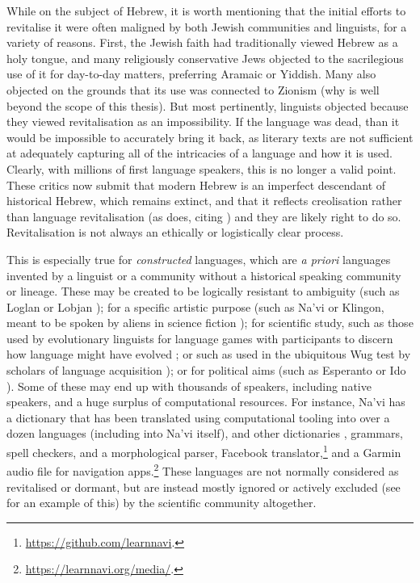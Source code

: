 While on the subject of Hebrew, it is worth mentioning that the initial efforts to revitalise it were often maligned by both Jewish communities and linguists, for a variety of reasons. First, the Jewish faith had traditionally viewed Hebrew as a holy tongue, and many religiously conservative Jews objected to the sacrilegious use of it for day-to-day matters, preferring Aramaic or Yiddish. Many also objected on the grounds that its use was connected to Zionism (why is well beyond the scope of this thesis). But most pertinently, linguists objected because they viewed revitalisation as an impossibility. If the language was dead, than it would be impossible to accurately bring it back, as literary texts are not sufficient at adequately capturing all of the intricacies of a language and how it is used. Clearly, with millions of first language speakers, this is no longer a valid point. These critics now submit that modern Hebrew is an imperfect descendant of historical Hebrew, which remains extinct, and that it reflects creolisation rather than language revitalisation (as \citet{kornai2013digital} does, citing \citet{bickerton2016roots,izreel2003emergence}) and they are likely right to do so. Revitalisation is not always an ethically or logistically clear process.

This is especially true for \textit{constructed} languages, which are \textit{a priori} languages invented by a linguist or a community without a historical speaking community or lineage. These may be created to be logically resistant to ambiguity (such as Loglan or Lobjan \citep{okrent2009land}); for a specific artistic purpose (such as Na'vi or Klingon, meant to be spoken by aliens in science fiction \citep{schreyer2015digital, schreyer2011media}); for scientific study, such as those used by evolutionary linguists for language games with participants to discern how language might have evolved \citep{scott2010language}; or such as used in the ubiquitous Wug test by scholars of language acquisition \citep{ratner2000beginning}); or for political aims (such as Esperanto or Ido \citep{okrent2009land}). Some of these may end up with thousands of speakers, including native speakers, and a huge surplus of computational resources. For instance, Na'vi has a dictionary \citep{navidictionary} that has been translated using computational tooling into over a dozen languages (including into Na'vi itself), and other dictionaries \citep{wmannis}, grammars, spell checkers, and a morphological parser, Facebook translator,\footnote{\href{https://github.com/learnnavi}{https://github.com/learnnavi}. } and a Garmin audio file for navigation apps.\footnote{\href{https://learnnavi.org/media/}{https://learnnavi.org/media/}. } These languages are not normally considered as revitalised or dormant, but are instead mostly ignored or actively excluded (see \citet{gibson2016assessing} for an example of this) by the scientific community altogether.

